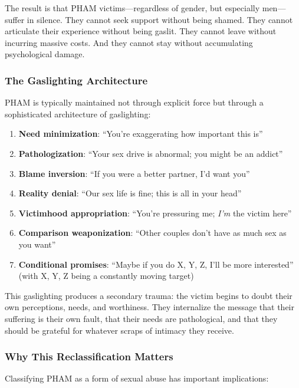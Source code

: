 \documentclass[12pt, letterpaper]{article}
\begin{document}
The result is that PHAM victims---regardless of gender, but especially men---suffer in silence. They cannot seek support without being shamed. They cannot articulate their experience without being gaslit. They cannot leave without incurring massive costs. And they cannot stay without accumulating psychological damage.

\subsubsection{The Gaslighting Architecture}

PHAM is typically maintained not through explicit force but through a sophisticated architecture of gaslighting:

\begin{enumerate}
    \item \textbf{Need minimization}: ``You're exaggerating how important this is''
    \item \textbf{Pathologization}: ``Your sex drive is abnormal; you might be an addict''
    \item \textbf{Blame inversion}: ``If you were a better partner, I'd want you''
    \item \textbf{Reality denial}: ``Our sex life is fine; this is all in your head''
    \item \textbf{Victimhood appropriation}: ``You're pressuring me; \textit{I'm} the victim here''
    \item \textbf{Comparison weaponization}: ``Other couples don't have as much sex as you want''
    \item \textbf{Conditional promises}: ``Maybe if you do X, Y, Z, I'll be more interested'' (with X, Y, Z being a constantly moving target)
\end{enumerate}

This gaslighting produces a secondary trauma: the victim begins to doubt their own perceptions, needs, and worthiness. They internalize the message that their suffering is their own fault, that their needs are pathological, and that they should be grateful for whatever scraps of intimacy they receive.

\subsubsection{Why This Reclassification Matters}

Classifying PHAM as a form of sexual abuse has important implications:
\end{document}
